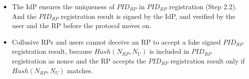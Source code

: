 \begin{itemize} %
  \item The IdP ensures the uniqueness of $PID_{RP}$ in $PID_{RP}$ registration (Step 2.2).
    And the $PID_{RP}$ registration result is signed by the IdP,
        and verified by the user and the RP before the protocol moves on.
  \item Collusive RPs and users cannot deceive an RP to accept
            a fake signed $PID_{RP}$ registration result,
            because $Hash(N_{RP}, N_U)$ is included in $PID_{RP}$ registration as nonce
            and the RP accepts the $PID_{RP}$ registration result only if $Hash(N_{RP}, N_U)$ matches.


\end{itemize}


